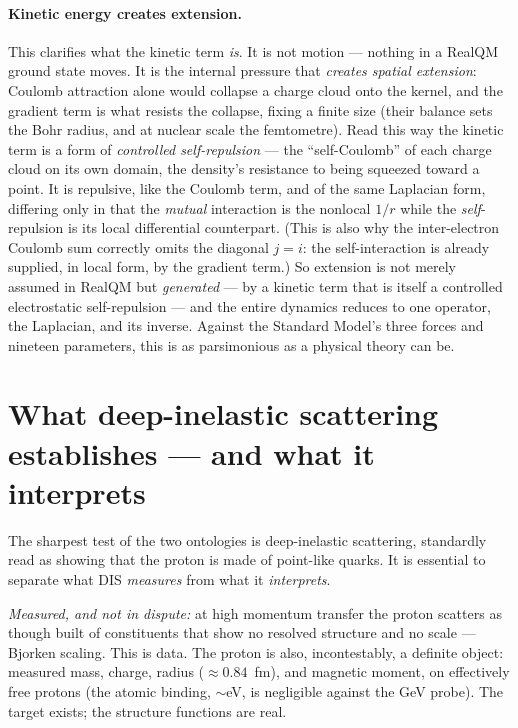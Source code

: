 \documentclass[11pt]{article}
\begin{document}
\paragraph{Kinetic energy creates extension.} This clarifies what the kinetic term \emph{is}. It is not
motion --- nothing in a RealQM ground state moves. It is the internal pressure that \emph{creates spatial
extension}: Coulomb attraction alone would collapse a charge cloud onto the kernel, and the gradient term
is what resists the collapse, fixing a finite size (their balance sets the Bohr radius, and at nuclear
scale the femtometre). Read this way the kinetic term is a form of \emph{controlled self-repulsion} --- the
``self-Coulomb'' of each charge cloud on its own domain, the density's resistance to being squeezed toward
a point. It is repulsive, like the Coulomb term, and of the same Laplacian form, differing only in that the
\emph{mutual} interaction is the nonlocal $1/r$ while the \emph{self}-repulsion is its local differential
counterpart. (This is also why the inter-electron Coulomb sum correctly omits the diagonal $j=i$: the
self-interaction is already supplied, in local form, by the gradient term.) So extension is not merely
assumed in RealQM but \emph{generated} --- by a kinetic term that is itself a controlled electrostatic
self-repulsion --- and the entire dynamics reduces to one operator, the Laplacian, and its inverse. Against
the Standard Model's three forces and nineteen parameters, this is as parsimonious as a physical theory can
be.

\section{What deep-inelastic scattering establishes --- and what it interprets}
\label{sec:dis}

The sharpest test of the two ontologies is deep-inelastic scattering, standardly read as showing that the
proton is made of point-like quarks. It is essential to separate what DIS \emph{measures} from what it
\emph{interprets}.

\emph{Measured, and not in dispute:} at high momentum transfer the proton scatters as though built of
constituents that show no resolved structure and no scale --- Bjorken scaling. This is data. The proton is
also, incontestably, a definite object: measured mass, charge, radius ($\approx 0.84$~fm), and magnetic
moment, on effectively free protons (the atomic binding, ${\sim}$eV, is negligible against the GeV probe).
The target exists; the structure functions are real.
\end{document}
